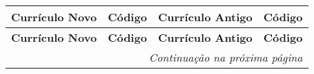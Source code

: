 \documentclass[oneside,envcountsame,envcountchap,openany]{svmono}
\begin{document}
\begin{small}
  \begin{longtable}{p{5.6cm}l|p{5.6cm}l}
    \label{tab:desc-equi-long}                                                                                                                    \\
    \hline
    \rowcolor{gray!20}
    \textbf{Currículo Novo} & \textbf{Código} & \textbf{Currículo Antigo}                                          & \textbf{Código}              \\
    \hline
    \endfirsthead

    \hline
    \rowcolor{gray!20}
    \textbf{Currículo Novo} & \textbf{Código} & \textbf{Currículo Antigo}                                          & \textbf{Código}              \\
    \hline
    \endhead

    \multicolumn{4}{r}{\small\itshape Continuação na próxima página}
    \endfoot


\end{longtable}
\end{small}
\end{document}
